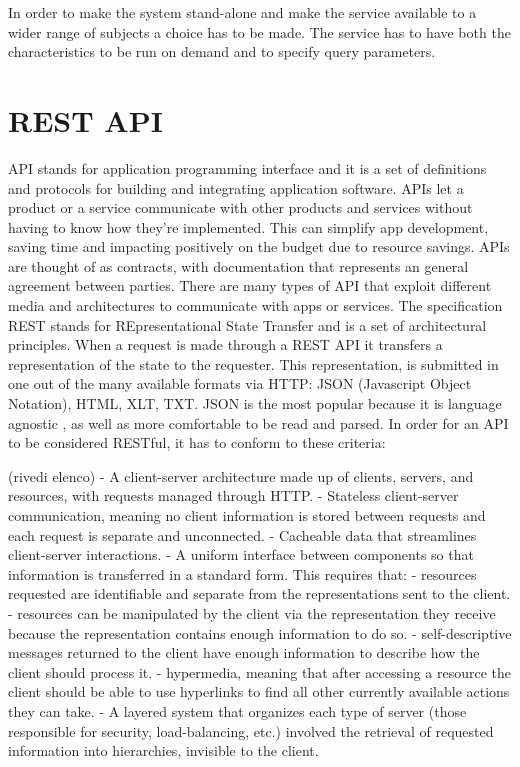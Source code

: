 \documentclass[
  12pt,
  a4paper,
  oneside]{book}
\begin{document}
In order to make the system stand-alone and make the service available to a wider range of subjects a choice has to be made. The service has to have both the characteristics to be run on demand and to specify query parameters.

\hypertarget{rest-api}{%
\section{REST API}\label{rest-api}}

API stands for application programming interface and it is a set of definitions and protocols for building and integrating application software. APIs let a product or a service communicate with other products and services without having to know how they're implemented. This can simplify app development, saving time and impacting positively on the budget due to resource savings. APIs are thought of as contracts, with documentation that represents an general agreement between parties.
There are many types of API that exploit different media and architectures to communicate with apps or services.
The specification REST stands for REpresentational State Transfer and is a set of architectural principles. When a request is made through a REST API it transfers a representation of the state to the requester. This representation, is submitted in one out of the many available formats via HTTP: JSON (Javascript Object Notation), HTML, XLT, TXT. JSON is the most popular because it is language agnostic \citep{what_is_a_rest_api}, as well as more comfortable to be read and parsed.
In order for an API to be considered RESTful, it has to conform to these criteria:

(rivedi elenco)
- A client-server architecture made up of clients, servers, and resources, with requests managed through HTTP.
- Stateless client-server communication, meaning no client information is stored between requests and each request is separate and unconnected.
- Cacheable data that streamlines client-server interactions.
- A uniform interface between components so that information is transferred in a standard form. This requires that:
- resources requested are identifiable and separate from the representations sent to the client.
- resources can be manipulated by the client via the representation they receive because the representation contains enough information to do so.
- self-descriptive messages returned to the client have enough information to describe how the client should process it.
- hypermedia, meaning that after accessing a resource the client should be able to use hyperlinks to find all other currently available actions they can take.
- A layered system that organizes each type of server (those responsible for security, load-balancing, etc.) involved the retrieval of requested information into hierarchies, invisible to the client.
\end{document}
